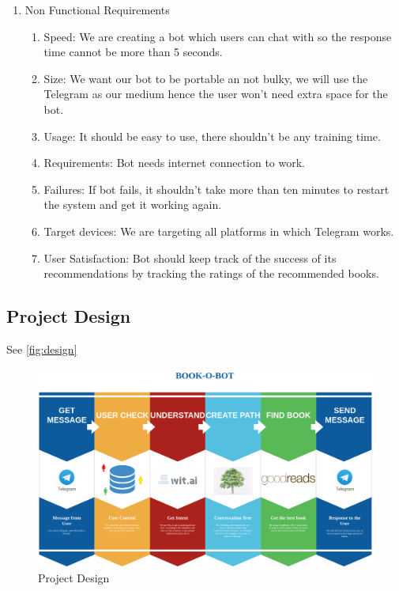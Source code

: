 \documentclass[a4paper]{article}
\begin{document}
\begin{enumerate}
\begin{enumerate}
\begin{enumerate}
    \end{enumerate}
  \end{enumerate}
\item Non Functional Requirements
  \begin{enumerate}
  \item Speed: We are creating a bot which users can chat with so the response time cannot be more than 5 seconds.
  \item Size: We want our bot to be portable an not bulky, we will use the Telegram as our medium hence the user won't need extra space for the bot.
  \item Usage: It should be easy to use, there shouldn't be any training time.
  \item Requirements: Bot needs internet connection to work.
  \item Failures: If bot fails, it shouldn't take more than ten minutes to restart the system and get it working again.
  \item Target devices: We are targeting all platforms in which Telegram works.
  \item User Satisfaction: Bot should keep track of the success of its recommendations by tracking the ratings of the recommended books.
  \end{enumerate}
\end{enumerate}
\newpage

\subsection{Project Design}

See \autoref{fig:design}

\begin{figure}[!hb]
  \includegraphics[width=\linewidth]{figures/design.png}
  \caption{Project Design}
  \label{fig:design}
\end{figure}
\end{document}
